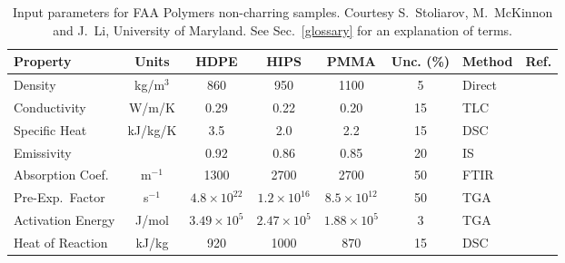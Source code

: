 \begin{table}[h!]
\caption[FAA non-charring polymer properties]{Input parameters for FAA Polymers non-charring samples. Courtesy S.~Stoliarov, M.~McKinnon and J.~Li, University of Maryland.
See Sec.~\ref{glossary} for an explanation of terms.}
\begin{center}
\begin{tabular}{|l|c|c|c|c|c|l|l|}
\hline
Property                    & Units         & HDPE                  & HIPS                  & PMMA                  & Unc. (\%) & Method                &  Ref.                         \\ \hline \hline
Density                     & kg/m$^3$      & 860                   & 950                   & 1100                  & 5         & Direct                &  \cite{Stoliarov:CF2009}      \\ \hline
Conductivity                & W/m/K         & 0.29                  & 0.22                  & 0.20                  & 15        & TLC                   &  \cite{Stoliarov:CF2009}      \\ \hline
Specific Heat               & kJ/kg/K       & 3.5                   & 2.0                   & 2.2                   & 15        & DSC                   &  \cite{Stoliarov:PDS2008}     \\ \hline
Emissivity                  &               & 0.92                  & 0.86                  & 0.85                  & 20        & IS                    &  \cite{Hallman:PES1974}       \\ \hline
Absorption Coef.            & m$^{-1}$      & 1300                  & 2700                  & 2700                  & 50        & FTIR                  &  \cite{Tsilingiris:ECM2003}   \\ \hline
Pre-Exp.~Factor             & s$^{-1}$      & $4.8 \times 10^{22}$  & $1.2 \times 10^{16}$  & $8.5 \times 10^{12}$  & 50        & TGA                   &  \cite{Stoliarov:CF2009}      \\ \hline
Activation Energy           & J/mol       & $3.49 \times 10^{5}$  & $2.47 \times 10^{5}$  & $1.88 \times 10^{5}$  & 3         & TGA                   &  \cite{Stoliarov:CF2009}      \\ \hline
Heat of Reaction            & kJ/kg         & 920                   & 1000                  & 870                   & 15        & DSC                   &  \cite{Stoliarov:PDS2008}     \\ \hline
\end{tabular}
\end{center}
\label{FAA_Properties}
\end{table}



